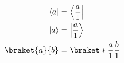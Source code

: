 \documentclass{article}
\DeclarePairedDelimiter\bra{\langle}{\rvert}
\DeclarePairedDelimiter\ket{\lvert}{\rangle}
\begin{document}
\begin{align*}
  \bra{a}       &= \bra*{\frac{a}{1}} \\
  \ket{a}       &= \ket*{\frac{a}{1}} \\
  \braket{a}{b} &= \braket*{\frac{a}{1}}{\frac{b}{1}}
\end{align*}
\end{document}
